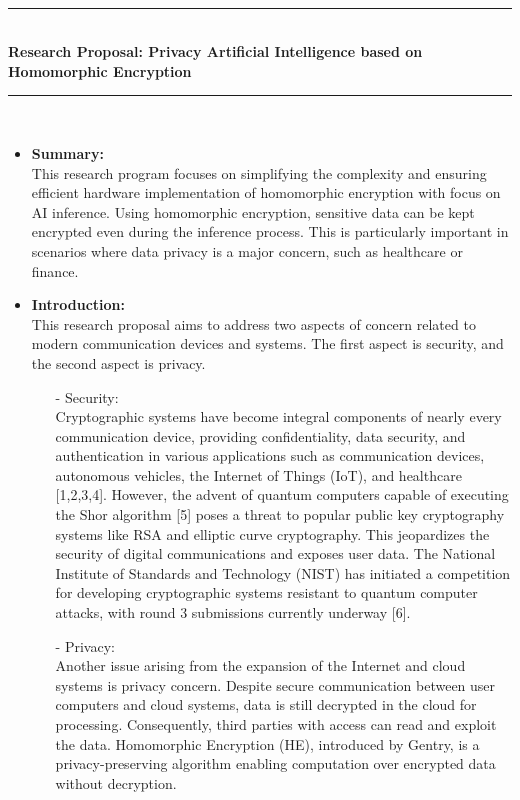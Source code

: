  \thispagestyle{empty}
 \phantom \quad \\
\hrule \phantom \quad  \vspace*{1\baselineskip}  \\
 {\bf Research Proposal: Privacy Artificial Intelligence based on  Homomorphic  Encryption }
 \vspace*{1\baselineskip}  \hrule \phantom \quad \\


\begin {itemize}
 \item [$\bullet$] { \bf Summary:} \vspace{0.5em} \\
This research program focuses on simplifying the complexity and ensuring efficient hardware implementation of 
homomorphic encryption with focus on AI inference. Using  homomorphic encryption, sensitive data can be kept encrypted even during the inference process. This is particularly important in scenarios where data privacy is a major concern, such as healthcare or finance.
 \item [$\bullet$] { \bf Introduction:} \vspace{0.5em} \\
This research proposal aims to address two aspects of concern related to modern communication devices and systems. The first aspect is security, and the second aspect is privacy.
\begin{itemize}
\item [-]
Security: \\ Cryptographic systems have become integral components of nearly every communication device, providing confidentiality, data security, and authentication in various applications such as communication devices, autonomous vehicles, the Internet of Things (IoT), and healthcare [1,2,3,4]. However, the advent of quantum computers capable of executing the Shor algorithm [5] poses a threat to popular public key cryptography systems like RSA and elliptic curve cryptography. This jeopardizes the security of digital communications and exposes user data. The National Institute of Standards and Technology (NIST) has initiated a competition for developing cryptographic systems resistant to quantum computer attacks, with round 3 submissions currently underway [6].
\item [-]
Privacy: \\ Another issue arising from the expansion of the Internet and cloud systems is privacy concern. Despite secure communication between user computers and cloud systems, data is still decrypted in the cloud for processing. Consequently, third parties with access can read and exploit the data. Homomorphic Encryption (HE), introduced by Gentry, is a privacy-preserving algorithm enabling computation over encrypted data without decryption.

\end{itemize}
\end{itemize}
